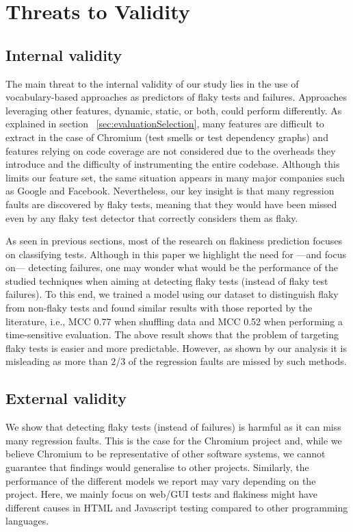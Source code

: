 \section{Threats to Validity}
\label{sec:chromium-threats}


\subsection{Internal validity}
The main threat to the internal validity of our study lies in the use of vocabulary-based approaches as predictors of flaky tests and failures. Approaches leveraging other features, \ie dynamic, static, or both, could perform differently. As explained in section ~\ref{sec:evaluationSelection}, many features are difficult to extract in the case of Chromium (\eg test smells or test dependency graphs) and features relying on code coverage are not considered due to the overheads they introduce and the difficulty of instrumenting the entire codebase. Although this limits our feature set, the same situation appears in many major companies such as Google and Facebook. Nevertheless, our key insight is that many regression faults are discovered by flaky tests, meaning that they would have been missed even by any flaky test detector that correctly considers them as flaky. 

As seen in previous sections, most of the research on flakiness prediction focuses on classifying tests. Although in this paper we highlight the need for ---and focus on--- detecting failures, one may wonder what would be the performance of the studied techniques when aiming at detecting flaky tests (instead of flaky test failures). To this end, we trained a model using our dataset to distinguish flaky from non-flaky tests and found similar results with those reported by the literature, i.e., MCC 0.77 when shuffling data and MCC 0.52 when performing a time-sensitive evaluation. The above result shows that the problem of targeting flaky tests is easier and more predictable. However, as shown by our analysis it is misleading as more than 2/3 of the regression faults are missed by such methods. 

\subsection{External validity}
We show that detecting flaky tests (instead of failures) is harmful as it can miss many regression faults. This is the case for the Chromium project and, while we believe Chromium to be representative of other software systems, we cannot guarantee that findings would generalise to other projects. Similarly, the performance of the different models we report may vary depending on the project. Here, we mainly focus on web/GUI tests and flakiness might have different causes in HTML and Javascript testing compared to other programming languages. 

